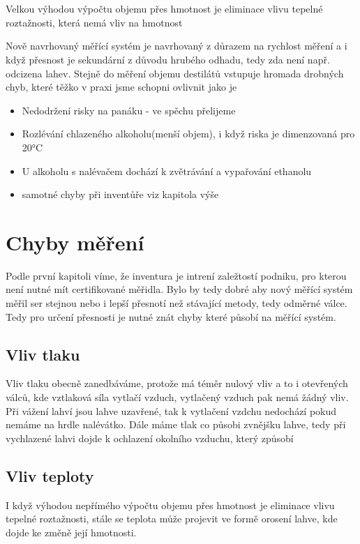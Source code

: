 \\ 
\\
Velkou výhodou výpočtu objemu přes hmotnost je eliminace vlivu tepelné roztažnosti, která nemá vliv na hmotnost

Nově navrhovaný měřící systém je navrhovaný z důrazem na rychlost měření a i když přesnost je sekundární z důvodu hrubého odhadu, tedy zda není např. odcizena lahev. Stejně do měření objemu destilátů vstupuje hromada drobných chyb, které těžko v praxi jsme schopni ovlivnit jako je
\begin{itemize}
    \item Nedodržení risky na panáku - ve spěchu přelijeme
    \item Rozlévání chlazeného alkoholu(menší objem), i když riska je dimenzovaná pro 20°C
    \item U alkoholu s nalévačem dochází k zvětrávání a vypařování ethanolu
    \item samotné chyby při inventůře viz kapitola výše
\end{itemize}

\section{Chyby měření}
Podle první kapitoli víme, že inventura je intrení zaležtostí podniku, pro kterou není nutné mít certifikované měřidla. Bylo by tedy dobré aby nový měřící systém měřil ser stejnou nebo i lepší přesnotí než stávající metody, tedy odměrné válce. Tedy pro určení přesnosti je nutné znát chyby které působí na měřící systém.
\subsection{Vliv tlaku}
Vliv tlaku obecně zanedbáváme, protože má téměr nulový vliv a to i otevřených válců, kde vztlaková síla vytlačí vzduch, vytlačený vzduch pak nemá žádný vliv. Při vážení lahví jsou lahve uzavřené, tak k vytlačení vzdchu nedochází pokud nemáme na hrdle nalévátko. Dále máme tlak co působi zvnějšku lahve, tedy při vychlazené lahvi dojde k ochlazení okolního vzduchu, který způsobí 

\subsection{Vliv teploty}
I když výhodou nepřímého výpočtu objemu přes hmotnost je eliminace vlivu tepelné roztažnosti, stále se teplota může projevit ve formě orosení lahve, kde dojde ke změně její hmotnosti.

